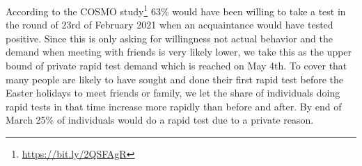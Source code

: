 According to the COSMO study\footnote{\url{https://bit.ly/2QSFAgR}} 63\% would have been
willing to take a test in the round of 23rd of February 2021 when an acquaintance would
have tested positive. Since this is only asking for willingness not actual behavior and
the demand when meeting with friends is very likely lower, we take this as the upper
bound of private rapid test demand which is reached on May 4th. To cover that many people
are likely to have sought and done their first rapid test before the Easter holidays to
meet friends or family, we let the share of individuals doing rapid tests in that time
increase more rapidly than before and after. By end of March 25\% of individuals would do
a rapid test due to a private reason.

